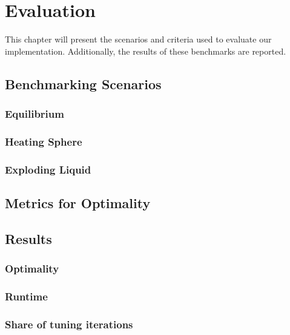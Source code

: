 \chapter[Evaluation]{Evaluation}
\label{cp:evaluation}

{
\parindent0pt
This chapter will present the scenarios and criteria used to evaluate our implementation. Additionally, the results of these benchmarks are reported.
}


\section{Benchmarking Scenarios}
\subsection{Equilibrium}
\subsection{Heating Sphere}
\subsection{Exploding Liquid}

\section{Metrics for Optimality}

\section{Results}
\subsection{Optimality}
\subsection{Runtime}
\subsection{Share of tuning iterations}

